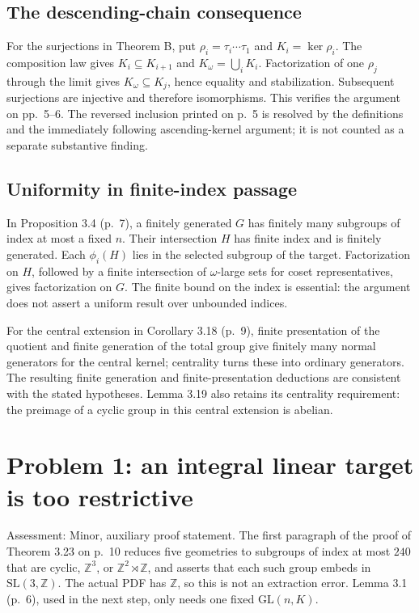 \documentclass[10pt]{article}
\begin{document}
\subsection*{The descending-chain consequence}
For the surjections in Theorem B, put \(\rho_i=\tau_i\cdots\tau_1\) and \(K_i=\ker\rho_i\). The composition law gives \(K_i\subseteq K_{i+1}\) and \(K_\omega=\bigcup_i K_i\). Factorization of one \(\rho_j\) through the limit gives \(K_\omega\subseteq K_j\), hence equality and stabilization. Subsequent surjections are injective and therefore isomorphisms. This verifies the argument on pp. 5–6. The reversed inclusion printed on p. 5 is resolved by the definitions and the immediately following ascending-kernel argument; it is not counted as a separate substantive finding.\par
\subsection*{Uniformity in finite-index passage}
In Proposition 3.4 (p. 7), a finitely generated \(G\) has finitely many subgroups of index at most a fixed \(n\). Their intersection \(H\) has finite index and is finitely generated. Each \(\phi_i(H)\) lies in the selected subgroup of the target. Factorization on \(H\), followed by a finite intersection of \(\omega\)-large sets for coset representatives, gives factorization on \(G\). The finite bound on the index is essential: the argument does not assert a uniform result over unbounded indices.\par
For the central extension in Corollary 3.18 (p. 9), finite presentation of the quotient and finite generation of the total group give finitely many normal generators for the central kernel; centrality turns these into ordinary generators. The resulting finite generation and finite-presentation deductions are consistent with the stated hypotheses. Lemma 3.19 also retains its centrality requirement: the preimage of a cyclic group in this central extension is abelian.\par
\section*{Problem 1: an integral linear target is too restrictive}
Assessment: Minor, auxiliary proof statement. The first paragraph of the proof of Theorem 3.23 on p. 10 reduces five geometries to subgroups of index at most \(240\) that are cyclic, \(\mathbb Z^3\), or \(\mathbb Z^2\rtimes\mathbb Z\), and asserts that each such group embeds in \(\mathrm{SL}(3,\mathbb Z)\). The actual PDF has \(\mathbb Z\), so this is not an extraction error. Lemma 3.1 (p. 6), used in the next step, only needs one fixed \(\mathrm{GL}(n,K)\).\par
\end{document}
